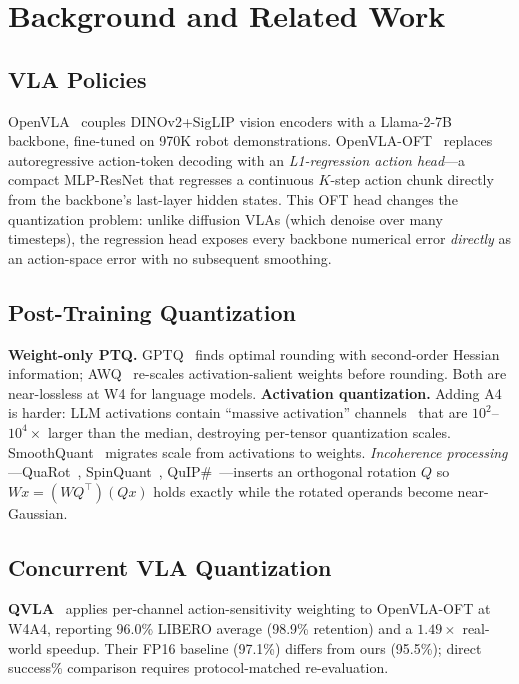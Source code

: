\documentclass[conference]{IEEEtran}
\begin{document}
\section{Background and Related Work}
\label{sec:related}

\subsection{VLA Policies}
OpenVLA~\cite{openvla} couples DINOv2+SigLIP vision encoders with a Llama-2-7B backbone,
fine-tuned on 970K robot demonstrations. OpenVLA-OFT~\cite{openvlaoft} replaces
autoregressive action-token decoding with an \emph{L1-regression action head}---a compact
MLP-ResNet that regresses a continuous $K$-step action chunk directly from the backbone's
last-layer hidden states. This OFT head changes the quantization problem: unlike diffusion
VLAs (which denoise over many timesteps), the regression head exposes every backbone
numerical error \emph{directly} as an action-space error with no subsequent smoothing.

\subsection{Post-Training Quantization}
\textbf{Weight-only PTQ.} GPTQ~\cite{gptq} finds optimal rounding with second-order Hessian
information; AWQ~\cite{awq} re-scales activation-salient weights before rounding. Both are
near-lossless at W4 for language models. \textbf{Activation quantization.} Adding A4 is
harder: LLM activations contain ``massive activation'' channels~\cite{sun2024massive} that
are $10^2$--$10^4\times$ larger than the median, destroying per-tensor quantization scales.
SmoothQuant~\cite{smoothquant} migrates scale from activations to weights.
\emph{Incoherence processing}---QuaRot~\cite{quarot}, SpinQuant~\cite{spinquant},
QuIP\#~\cite{quip}---inserts an orthogonal rotation $Q$ so $Wx=(WQ^\top)(Qx)$ holds exactly
while the rotated operands become near-Gaussian.

\subsection{Concurrent VLA Quantization}
\label{sec:related_vla}

\textbf{QVLA}~\cite{qvla} applies per-channel action-sensitivity weighting
to OpenVLA-OFT at W4A4, reporting 96.0\% LIBERO average (98.9\% retention) and a
$1.49\times$ real-world speedup. Their FP16 baseline (97.1\%) differs from ours (95.5\%);
direct success\% comparison requires protocol-matched re-evaluation.
\end{document}
